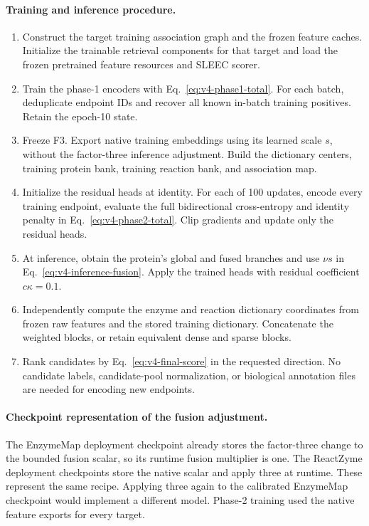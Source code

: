 \paragraph{Training and inference procedure.}
\begin{enumerate}[leftmargin=*,itemsep=5pt]
  \item Construct the target training association graph and the frozen feature
  caches. Initialize the trainable retrieval components for that target and
  load the frozen pretrained feature resources and SLEEC scorer.
  \item Train the phase-1 encoders with Eq.~\eqref{eq:v4-phase1-total}. For
  each batch, deduplicate endpoint IDs and recover all known in-batch training
  positives. Retain the epoch-10 state.
  \item Freeze F3. Export native training embeddings using its learned scale
  $s$, without the factor-three inference adjustment. Build the dictionary
  centers, training protein bank, training reaction bank, and association map.
  \item Initialize the residual heads at identity. For each of 100 updates,
  encode every training endpoint, evaluate the full bidirectional
  cross-entropy and identity penalty in Eq.~\eqref{eq:v4-phase2-total}.
  Clip gradients and update only the residual heads.
  \item At inference, obtain the protein's global and fused branches and use
  $\nu s$ in Eq.~\eqref{eq:v4-inference-fusion}. Apply the trained heads with
  residual coefficient $c\kappa=0.1$.
  \item Independently compute the enzyme and reaction dictionary coordinates
  from frozen raw features and the stored training dictionary. Concatenate
  the weighted blocks, or retain equivalent dense and sparse blocks.
  \item Rank candidates by Eq.~\eqref{eq:v4-final-score} in the requested
  direction. No candidate labels, candidate-pool normalization, or biological
  annotation files are needed for encoding new endpoints.
\end{enumerate}

\paragraph{Checkpoint representation of the fusion adjustment.}
The EnzymeMap deployment checkpoint already stores the factor-three change
to the bounded fusion scalar, so its runtime fusion multiplier is one.
The ReactZyme deployment checkpoints store the native scalar and apply three
at runtime. These represent the same recipe. Applying three again to the
calibrated EnzymeMap checkpoint would implement a different model. Phase-2
training used the native feature exports for every target.

